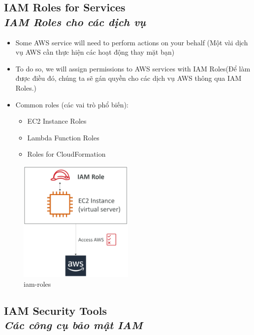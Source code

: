 \subsection[IAM Roles for Services]{IAM Roles for Services \\ \textit{IAM Roles cho các dịch vụ}}

\begin{itemize}
	\item Some AWS service will need to perform actions on your behalf (Một vài dịch vụ AWS cần thực hiện các hoạt động thay mặt bạn)
	\item To do so, we will assign permissions to AWS services with IAM Roles(Để làm được điều đó, chúng ta sẽ gán quyền cho các dịch vụ AWS thông qua IAM Roles.)
	\item Common roles (các vai trò phổ biến):
	\begin{itemize}
		\item EC2 Instance Roles
		\item Lambda Function Roles
		\item Roles for CloudFormation
	\end{itemize}
\end{itemize}

\begin{figure}[htbp]
	\centering
	\includegraphics[width=0.5\textwidth]{images/iam-roles}
	\caption{iam-roles}
	\label{fig:iam-roles}
\end{figure}

\subsection[IAM Security Tools]{IAM Security Tools \\ \textit{Các công cụ bảo mật IAM}}


